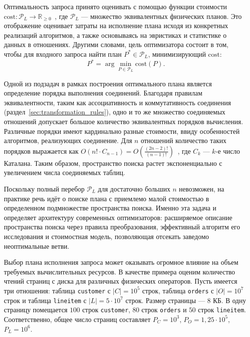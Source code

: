 \documentclass[14pt, russian]{scrartcl}
\begin{document}
Оптимальность запроса принято оценивать с помощью функции стоимости
\(\mathrm{cost} \colon \mathcal{P}_L \to \mathbb{R}_{\ge 0}\)~\cite{Selinger1979},
где \(\mathcal{P}_{L}\) --- множество эквивалентных физических планов. Это
отображение оценивает затраты на исполнение плана исходя из конкретных
реализаций алгоритмов, а также основываясь на эвристиках и статистике о данных в
отношениях. Другими словами, цель оптимизатора состоит в том, чтобы для входного
запроса найти план \(P^* \in \mathcal{P}_L\), минимизирующий \(\mathrm{cost}\):
\[
  P^* = \arg\min_{P \in \mathcal{P}_L} \mathrm{cost}(P).
\]

Одной из подзадач в рамках построения оптимального плана является определение
порядка выполнения соединений. Благодаря правилам эквивалентности, таким как
ассоциативность и коммутативность соединения
(раздел~\ref{sec:transformation_rules}), одно и то же множество соединяемых
отношений допускает большое количество эквивалентных порядков вычисления.
Различные порядки имеют кардинально разные стоимости, ввиду особенностей
алгоритмов, реализующих соединение. Для \(n\) отношений количество таких
порядков выражается как
\(O(n! \cdot C_{n-1}) = O(\frac{(2n-2)!}{(n-1)!})\)~\cite{IntroToTheJoinOrderingProblem},
где \(C_k\) --- \(k\)-е число Каталана. Таким образом, пространство поиска
растет экспоненциально с увеличением числа соединяемых таблиц.

Поскольку полный перебор \(\mathcal{P}_L\) для достаточно больших \(n\)
невозможен, на практике речь идёт о поиске плана с приемлемо малой стоимостью в
определенном подмножестве пространства поиска. Именно эта задача и определяет
архитектуру современных оптимизаторов: расширяемое описание пространства поиска
через правила преобразования, эффективный алгоритм его исследования и
стоимостная модель, позволяющая отсекать заведомо неоптимальные ветви.

Выбор плана исполнения запроса может оказывать огромное влияние на объем
требуемых вычислительных ресурсов. В качестве примера оценим количество чтений
страниц с диска для различных физических операторов. Пусть имеется три
отношения: таблица \texttt{customer} с \(|C| = 10^5\) строк, таблица
\texttt{orders} с \(|O| = 10^7\) строк и таблица \texttt{lineitem} с
\(|L| = 5 \cdot 10^7\) строк. Размер страницы --- \(8\) КБ. В одну страницу
помещается \(100\) строк \texttt{customer}, \(80\) строк \texttt{orders} и
\(50\) строк \texttt{lineitem}. Соответственно, общее число страниц составляет
\(P_C = 10^3\), \(P_O = 1{,}25 \cdot 10^5\), \(P_L = 10^6\).
\end{document}
